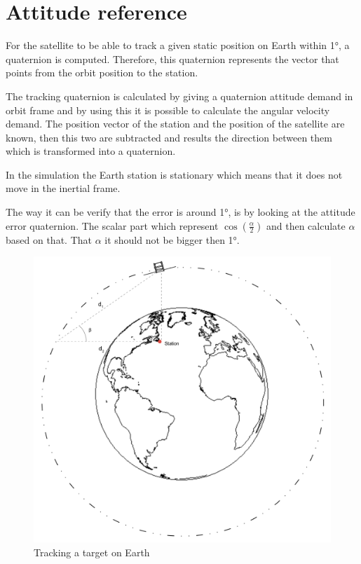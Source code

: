 \section{Attitude reference}
For the satellite to be able to track a given static position on Earth within 1°, a quaternion is computed. Therefore, this quaternion represents the vector that points from the orbit position to the station.

The tracking quaternion is calculated by giving a quaternion attitude demand in orbit frame and by using this it is possible to calculate the angular velocity demand. The position vector of the station and the position of the satellite are known, then this two are subtracted and results the direction between them which is transformed into a quaternion.

In the simulation the Earth station is stationary which means that it does not move in the inertial frame.

The way it can be verify that the error is around 1°, is by looking at the attitude error quaternion.  The scalar part which represent $\cos (\frac{\alpha}{2}) $ and then calculate $\alpha$ based on that.  That $\alpha$ it should not be bigger then 1°.

\begin{figure}[H]
	\centering
	\includegraphics[width=0.6\linewidth]{figures/TS}
	\caption{Tracking a target on Earth }
	\label{fig:TS}
\end{figure}

 